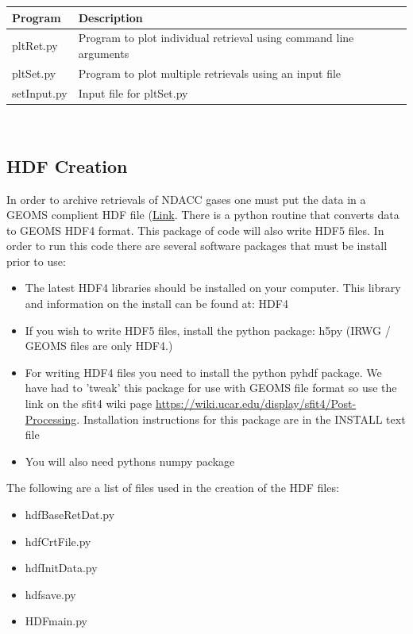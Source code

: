 \documentclass[12pt, letterpaper]{article}
\begin{document}
\begin{tabular}{ l l }
\textbf{Program} & \textbf{Description} \\
\hline
pltRet.py      & Program to plot individual retrieval using command line arguments\\
pltSet.py      & Program to plot multiple retrievals using an input file\\
setInput.py    & Input file for pltSet.py\\

\end{tabular} \\

\subsection{HDF Creation}
In order to archive retrievals of NDACC gases one must put the data in a GEOMS complient HDF file (\href{http://avdc.gsfc.nasa.gov/index.php?site=1989220925}{Link}. There is a python routine that converts data to GEOMS HDF4 format. This package of code will also write HDF5 files. In order to run this code there are several software packages that must be install prior to use:

\begin{itemize}
\item The latest HDF4 libraries should be installed on your computer. This library and information on the install can be found at: HDF4
\item If you wish to write HDF5 files, install the python package: h5py (IRWG / GEOMS files are only HDF4.)
\item For writing HDF4 files you need to install the python pyhdf package. We have had to 'tweak' this package for use with GEOMS file format so use the link on the sfit4 wiki page \href{https://wiki.ucar.edu/display/sfit4/Post-Processing}{https://wiki.ucar.edu/display/sfit4/Post-Processing}. Installation instructions for this package are in the INSTALL text file
\item You will also need pythons numpy package
\end{itemize}

The following are a list of files used in the creation of the HDF files:

\begin{itemize}
\item hdfBaseRetDat.py
\item hdfCrtFile.py
\item hdfInitData.py
\item hdfsave.py
\item HDFmain.py
\end{itemize}
\end{document}
